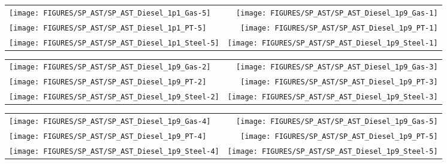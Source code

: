 \begin{figure}[p]
\begin{tabular*}{\textwidth}{l@{\extracolsep{\fill}}r}
\texttt{[image: FIGURES/SP\_AST/SP\_AST\_Diesel\_1p1\_Gas-5]}   &  \texttt{[image: FIGURES/SP\_AST/SP\_AST\_Diesel\_1p9\_Gas-1]}   \\
\texttt{[image: FIGURES/SP\_AST/SP\_AST\_Diesel\_1p1\_PT-5]}    &  \texttt{[image: FIGURES/SP\_AST/SP\_AST\_Diesel\_1p9\_PT-1]}    \\
\texttt{[image: FIGURES/SP\_AST/SP\_AST\_Diesel\_1p1\_Steel-5]} &  \texttt{[image: FIGURES/SP\_AST/SP\_AST\_Diesel\_1p9\_Steel-1]} 
\end{tabular*}
\label{SP_Diesel_1p1_5m}
\end{figure}

\begin{figure}[p]
\begin{tabular*}{\textwidth}{l@{\extracolsep{\fill}}r}
\texttt{[image: FIGURES/SP\_AST/SP\_AST\_Diesel\_1p9\_Gas-2]}   &  \texttt{[image: FIGURES/SP\_AST/SP\_AST\_Diesel\_1p9\_Gas-3]}   \\
\texttt{[image: FIGURES/SP\_AST/SP\_AST\_Diesel\_1p9\_PT-2]}    &  \texttt{[image: FIGURES/SP\_AST/SP\_AST\_Diesel\_1p9\_PT-3]}    \\
\texttt{[image: FIGURES/SP\_AST/SP\_AST\_Diesel\_1p9\_Steel-2]} &  \texttt{[image: FIGURES/SP\_AST/SP\_AST\_Diesel\_1p9\_Steel-3]} 
\end{tabular*}
\label{SP_Diesel_1p9_2m}
\end{figure}

\begin{figure}[p]
\begin{tabular*}{\textwidth}{l@{\extracolsep{\fill}}r}
\texttt{[image: FIGURES/SP\_AST/SP\_AST\_Diesel\_1p9\_Gas-4]}   &  \texttt{[image: FIGURES/SP\_AST/SP\_AST\_Diesel\_1p9\_Gas-5]}   \\
\texttt{[image: FIGURES/SP\_AST/SP\_AST\_Diesel\_1p9\_PT-4]}    &  \texttt{[image: FIGURES/SP\_AST/SP\_AST\_Diesel\_1p9\_PT-5]}    \\
\texttt{[image: FIGURES/SP\_AST/SP\_AST\_Diesel\_1p9\_Steel-4]} &  \texttt{[image: FIGURES/SP\_AST/SP\_AST\_Diesel\_1p9\_Steel-5]} 
\end{tabular*}
\label{SP_Diesel_1p9_4m}
\end{figure}

